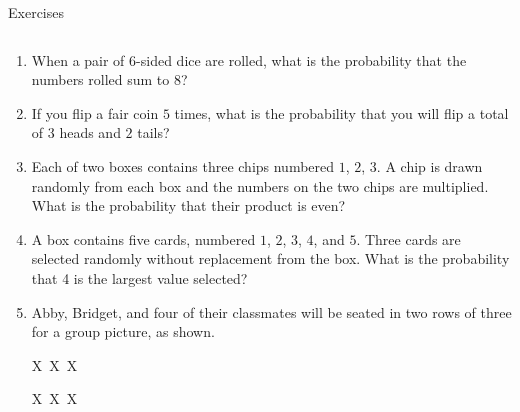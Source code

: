 \documentclass[9pt,aspectratio=169]{beamer}
\begin{document}
\begin{frame}{Exercises}
  \begin{columns}[T]
    \begin{column}{0.5\textwidth}
      \setlength{\leftmargini}{0cm}
      \begin{enumerate}
        \item When a pair of $6$-sided dice are rolled, what is the probability that the numbers rolled sum to $8$?
        \item If you flip a fair coin $5$ times, what is the probability that you will flip a total of $3$ heads and $2$ tails?
        \item Each of two boxes contains three chips numbered $1$, $2$, $3$. A chip is drawn randomly from each box and the numbers on the two chips are multiplied. What is the probability that their product is even? %
        \item A box contains five cards, numbered $1$, $2$, $3$, $4$, and $5$. Three cards are selected randomly without replacement from the box. What is the probability that 4 is the largest value selected? %
        \item \begin{minipage}[t]{\textwidth-6em}
          Abby, Bridget, and four of their classmates will be seated in two rows of three for a group picture, as shown.
        \end{minipage}
        \begin{minipage}[t]{3.5em}
          \quad X\ X\ X

          \quad X\ X\ X
        \end{minipage}


\end{enumerate}
\end{column}
\end{columns}
\end{frame}
\end{document}
